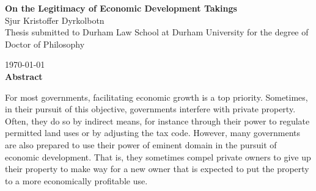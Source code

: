 
\cleardoublepage
{}

\begin{quoting}
  \singlespace
    \begin{center}
  {\LARGE \bfseries  On the Legitimacy of Economic Development Takings }\\
  \vspace*{0.5cm}
      {\large Sjur Kristoffer Dyrkolbotn}\\
  \vspace*{0.2cm}  
    {\normalsize Thesis submitted to Durham Law School at Durham University for the degree of Doctor of Philosophy}

  \vspace*{0.2cm}  
    {\normalsize \today}\\
  \vspace*{0.5cm}  
    {\normalsize \bfseries Abstract}      
  \end{center}
  {\parindent0pt
For most governments, facilitating economic growth is a top priority. Sometimes, in their pursuit of this objective, governments interfere with private property. Often, they do so by indirect means, for instance through their power to regulate permitted land uses or by adjusting the tax code. However, many governments are also prepared to use their power of eminent domain in the pursuit of economic development. That is, they sometimes compel private owners to give up their property to make way for a new owner that is expected to put the property to a more economically profitable use. %
}
\vspace{0.7mm}


\end{quoting}
